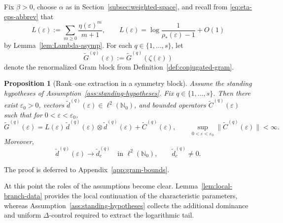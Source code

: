 \documentclass[11pt]{amsart}
\numberwithin{equation}{section}
\theoremstyle{plain}
\newtheorem{proposition}[theorem]{Proposition}
\theoremstyle{definition}
\theoremstyle{remark}
\newcommand{\N}{\mathbb{N}}
\begin{document}
Fix \(\beta>0\), choose \(\alpha\) as in
Section~\ref{subsec:weighted-space}, and recall from \eqref{eq:eta-eps-abbrev} that
\[
	L(\varepsilon):=\sum_{m\ge0}\frac{\eta(\varepsilon)^m}{m+1},\qquad L(\varepsilon)=\log \frac{1}{\rho_*(\varepsilon)-1}+O(1)
\]
by Lemma~\ref{lem:Lambda-asymp}. For each \(q\in\{1,\dots,s\}\), let
\[
	\widetilde G^{(q)}(\varepsilon)
	:=\widetilde G^{(q)}(\zeta(\varepsilon))
\]
denote the renormalized Gram block from
Definition~\ref{def:conjugated-gram}.

\begin{proposition}[Rank--one extraction in a symmetry block]
	\label{prop:rank-one-extraction}
	Assume the standing hypotheses of
	Assumption~\ref{ass:standing-hypotheses}. Fix
	$q\in\{1,\dots,s\}$. Then there exist $\varepsilon_0>0$, vectors
	$\widetilde d^{(q)}(\varepsilon)\in\ell^2(\N_0)$, and bounded operators
	$\widetilde C^{(q)}(\varepsilon)$ such that for
	$0<\varepsilon<\varepsilon_0$,
	\begin{equation}\label{eq:Gq-tilde-decomposition}
		\widetilde G^{(q)}(\varepsilon)
		=
		L(\varepsilon)\,
		\widetilde d^{(q)}(\varepsilon)\otimes
		\widetilde d^{(q)}(\varepsilon)
		+
		\widetilde C^{(q)}(\varepsilon),
		\qquad
		\sup_{0<\varepsilon<\varepsilon_0}
		\|\widetilde C^{(q)}(\varepsilon)\|<\infty.
	\end{equation}
	Moreover,
	\[
		\widetilde d^{(q)}(\varepsilon)\to \widetilde d^{(q)}_c
		\quad\text{in }\ell^2(\N_0),
		\qquad
		\widetilde d^{(q)}_c\neq0.
	\]
\end{proposition}

The proof is deferred to Appendix~\ref{app:gram-bounds}.

At this point the roles of the assumptions become clear. Lemma~\ref{lem:local-branch-data} provides the local continuation of the characteristic parameters, whereas Assumption~\ref{ass:standing-hypotheses} collects the additional dominance and uniform
$\Delta$-control required to extract the logarithmic tail.
\end{document}
